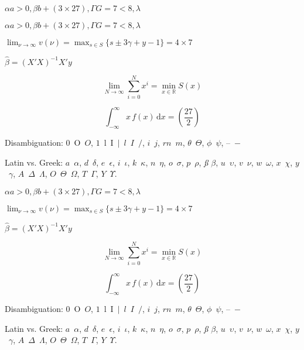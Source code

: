 \documentclass[12pt, a4paper, oneside]{article}
\newcommand{\mathup}[1]{\mathrm{#1}}
\theoremstyle{Plain}
\theoremstyle{Definition}
\theoremstyle{Remark}
\begin{document}
\begin{appendix}
\setlength{\parindent}{0pt}

\noindent%
\checkgreekletters

\noindent%
{\boldmath\checkgreekletters}

\noindent%
{\sffamily\selectfont \checkgreekletters}

\noindent%
{\sffamily\bfseries\selectfont \checkgreekletters}

\noindent%
{\sffamily $\alpha a > 0, \beta b + (3 \times 27), \Gamma G = 7 < 8, \lambda$}

\noindent%
$\alpha a > 0, \beta b + (3 \times 27), \Gamma G = 7 < 8, \lambda$

$\lim_{\nu \to \infty} v(\nu) = \max_{s \in S} \{s \pm 3 \gamma + y - 1\} = 4 \times 7$

$\hat{\beta} = (X'X)^{-1}X'y$

$$\lim_{N \to \infty} \sum_{i=0}^{N} x^i = \min_{x \in \mathbb{R}} S(x)$$

$$\int_{-\infty}^{\infty} x\,f(x)\,\mathup{d}x = \left( \frac{27}{2} \right)$$

Disambiguation: $0$~O~$O$, $1$~l~I~$|$~$l$~$I$~$/$, $i$~$j$, $rn$~$m$, $\theta$~$\Theta$, $\phi$~$\psi$, --~$-$

Latin vs. Greek: $a$~$\alpha$, $d$~$\delta$, $e$~$\epsilon$, $i$~$\iota$, $k$~$\kappa$, $n$~$\eta$, $o$~$\sigma$, $p$~$\rho$, \textit{\ss} $\beta$, $u$~$\upsilon$, $v$~$\nu$, $w$~$\omega$, $x$~$\chi$, $y$~$\gamma$, $A$~$\Delta$~$\Lambda$, $O$~$\Theta$~$\Omega$, $T$~$\Gamma$, $Y$~$\Upsilon$.

\noindent%
{\bfseries%
$\alpha a > 0, \beta b + (3 \times 27), \Gamma G = 7 < 8, \lambda$

$\lim_{\nu \to \infty} v(\nu) = \max_{s \in S} \{s \pm 3 \gamma + y - 1\} = 4 \times 7$

$\hat{\beta} = (X'X)^{-1}X'y$

$$\lim_{N \to \infty} \sum_{i=0}^{N} x^i = \min_{x \in \mathbb{R}} S(x)$$

$$\int_{-\infty}^{\infty} x\,f(x)\,\mathup{d}x = \left( \frac{27}{2} \right)$$

Disambiguation: $0$~O~$O$, $1$~l~I~$|$~$l$~$I$~$/$, $i$~$j$, $rn$~$m$, $\theta$~$\Theta$, $\phi$~$\psi$, --~$-$

Latin vs. Greek: $a$~$\alpha$, $d$~$\delta$, $e$~$\epsilon$, $i$~$\iota$, $k$~$\kappa$, $n$~$\eta$, $o$~$\sigma$, $p$~$\rho$, \textit{\ss} $\beta$, $u$~$\upsilon$, $v$~$\nu$, $w$~$\omega$, $x$~$\chi$, $y$~$\gamma$, $A$~$\Delta$~$\Lambda$, $O$~$\Theta$~$\Omega$, $T$~$\Gamma$, $Y$~$\Upsilon$.
}


\end{appendix}
\end{document}
